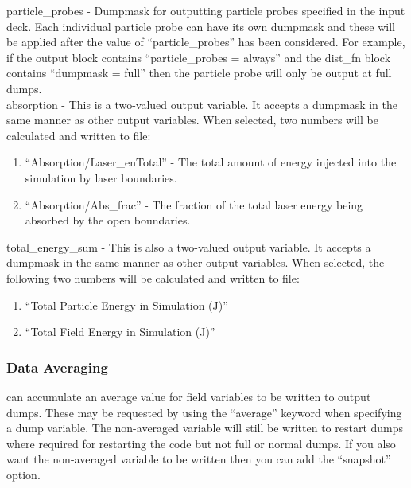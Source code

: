 {\emphtext particle\_probes} - Dumpmask for outputting particle
probes specified in the input deck. Each individual particle probe
can have its own dumpmask and these will be applied after the value of
``particle\_probes'' has been considered. For example, if the
output block contains ``particle\_probes = always'' and the dist\_fn
block contains ``dumpmask = full'' then the particle probe will
only be output at full dumps.\\

{\emphtext absorption} - This is a two-valued output variable. It accepts a
  dumpmask in the same manner as other output variables. When selected, two
  numbers will be calculated and written to file:%
\vspace{-1.5mm}\begin{enumerate}
  \itemsep0em
  \item ``Absorption/Laser\_enTotal'' - The total amount of energy injected
  into the simulation by laser boundaries.
  \item ``Absorption/Abs\_frac'' - The fraction of the total laser energy being
  absorbed by the open boundaries.
\end{enumerate}
\vspace{1.5mm}

{\emphtext total\_energy\_sum} - This is also a two-valued output variable. It
  accepts a dumpmask in the same manner as other output variables. When
  selected, the following two numbers will be calculated and written to file:%
\vspace{-1.5mm}\begin{enumerate}
  \itemsep0em
  \item ``Total Particle Energy in Simulation (J)''
  \item ``Total Field Energy in Simulation (J)''
\end{enumerate}

\subsubsection{Data Averaging}
\label{sec:average}
{\EPOCH} can accumulate an average value for field variables to be written
to output dumps. These may be requested by using the ``average'' keyword when
specifying a dump variable. The non-averaged variable will still be written
to restart dumps where required for restarting the code but not full or normal
dumps. If you also want the non-averaged variable to be written then you can
add the ``snapshot'' option.

